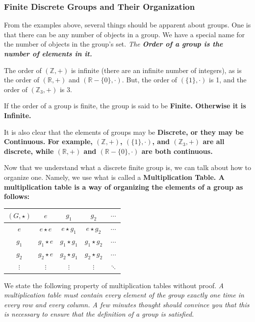 \documentclass[12pt,epsf]{article}
\begin{document}
\subsubsection{Finite Discrete Groups and Their Organization}

From the examples above, several things should be apparent about
groups.  One is that there can be any number of objects in a group.  We
have a special name for the number of objects in the group's set.  \it
The \bf Order \it of a group is the number of elements in it.  \rm

The order of $(\mathbb{Z},+)$ is infinite (there are an infinite number
of integers), as is the order of $(\mathbb{R},+)$ and
$(\mathbb{R}-\{0\},\cdot)$.  But, the order of $(\{1\},\cdot)$ is 1,
and the order of $(\mathbb{Z}_3,+)$ is 3.  

If the order of a group is finite, the group is said to be \bf
Finite\rm.  Otherwise it is \bf Infinite\rm.  

It is also clear that the elements of groups may be \bf Discrete\rm, or
they may be \bf Continuous\rm.	For example, $(\mathbb{Z},+)$,
$(\{1\},\cdot)$, and $(\mathbb{Z}_3,+)$ are all discrete, while
$(\mathbb{R},+)$ and $(\mathbb{R}-\{0\},\cdot)$ are both continuous.  

Now that we understand what a discrete finite group is, we can talk
about how to organize one.  Namely, we use what is called a \bf
Multiplication Table\rm.  A multiplication table is a way of organizing
the elements of a group as follows:
\newline
\begin{table} [h]
\centering
\begin{tabular}{|c||c|c|c|c|}
\hline
$(G,\star)$ & $e$ & $g_1$ & $g_2$ & $\cdots$ \\
\hline 
\hline
$e$ & $e\star e$ & $e\star g_1$ & $e \star g_2$ & $\cdots$ \\
\hline
$g_1$ & $g_1\star e$ & $ g_1 \star g_1 $ & $g_1 \star g_2$ & $\cdots$
\\
\hline
$g_2$ & $g_2\star e$ & $ g_2 \star g_1 $ & $g_2 \star g_2$ & $\cdots$
\\
\hline
$\vdots$ & $\vdots$ & $\vdots$ & $\vdots$ & $\ddots$ \\
\hline
\end{tabular}
\end{table}
\newline
We state the following property of multiplication tables without proof.
 \it A multiplication table must contain every element of the group
exactly one time in every row and every column\rm.  A few minutes
thought should convince you that this is necessary to ensure that the
definition of a group is satisfied.  
\end{document}
